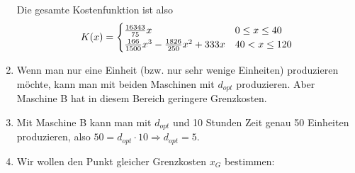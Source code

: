 \documentclass{article}
\begin{document}
\begin{enumerate}[label=(\alph*)]
		Die gesamte Kostenfunktion ist also
		\begin{align}
			K(x) = \begin{cases}
				\frac{16343}{75}x & 0\le x\le 40 \\
				\frac{166}{1500}x^3 - \frac{1826}{250}x^2 + 333x & 40 < x \le 120
			\end{cases} \notag
		\end{align}
		\item Wenn man nur eine Einheit (bzw. nur sehr wenige Einheiten) produzieren möchte, kann man mit beiden Maschinen mit $d_{opt}$ produzieren. Aber Maschine B hat in diesem Bereich geringere Grenzkosten.
		\item Mit Maschine B kann man mit $d_{opt}$ und 10 Stunden Zeit genau 50 Einheiten produzieren, also $50 = d_{opt} \cdot 10 \Rightarrow d_{opt}=5$.
		\item Wir wollen den Punkt gleicher Grenzkosten $x_G$ bestimmen:
		\begin{center}
\end{center}
\end{enumerate}
\end{document}
